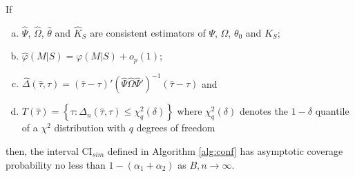 \begin{thm}
\label{pro:sim}
If
\begin{enumerate}[(a)]
	\item $\widehat{\Psi}$, $\widehat{\Omega}$, $\widehat{\theta}$ and $\widehat{K}_S$ are consistent estimators of $\Psi$, $\Omega$, $\theta_0$ and $K_S$;
	\item $\widehat{\varphi}(M|S) = \varphi(M|S)+ o_p(1)$;
	\item $\widehat{\Delta}(\widehat{\tau},\tau) = \left(\widehat{\tau} - \tau\right)' \left(\widehat{\Psi}\widehat{\Omega}\widehat{\Psi}'\right)^{-1} \left(\widehat{\tau} - \tau\right)$ and
	\item $T(\widehat{\tau}) = \left\{\tau \colon  \Delta_n(\widehat{\tau},\tau) \leq \chi^2_q(\delta)\right\}$ where $\chi^2_q(\delta)$ denotes the $1-\delta$ quantile of a $\chi^2$ distribution with $q$ degrees of freedom
\end{enumerate}
then, the interval $\mbox{CI}_{sim}$ defined in Algorithm \ref{alg:conf} has asymptotic coverage probability no less than $1-(\alpha_1 + \alpha_2)$ as $B,n\rightarrow \infty$.
\end{thm}




